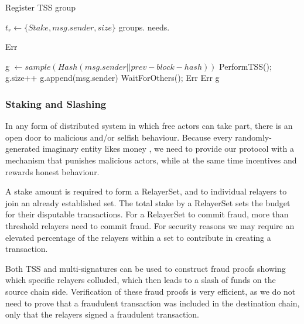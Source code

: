     	\begin{algorithm}[H]
			\caption{Register TSS group}
			\begin{algorithmic}[1]
				\Require $t_r \gets \{Stake, msg.sender, size\}$
				\Require groups.  
				\Require needs.
				
				    \State \Return Err
				\EndIf
				
				    \State g $\gets sample(Hash(msg.sender || prev-block-hash))$ 
				        \State PerformTSS();
				    \Else
				        \State g.size++
				        \State g.append(msg.sender)
				        \State WaitForOthers();
				        \Else
				    	\State \Return Err
				    	\EndIf
				    \EndIf
				\Else
				\State \Return Err
				\EndIf
				\State \Return g
			\end{algorithmic}
			\label{alg:register_TSS}
		\end{algorithm}

\subsubsection*{Staking and Slashing}
In any form of distributed system in which free actors can take part, there is an open door to malicious and/or selfish behaviour. Because every randomly-generated imaginary entity likes money \cite{LightningNetwork}, we need to provide our protocol with a mechanism that punishes malicious actors, while at the same time incentives and rewards honest behaviour.

A stake amount is required to form a RelayerSet, and to individual relayers to join an already established set. The total stake by a RelayerSet sets the budget for their disputable transactions. For a RelayerSet to commit fraud, more than threshold relayers need to commit fraud. For security reasons we may require an elevated percentage of the relayers within a set to contribute in creating a transaction. 

Both TSS and multi-signatures can be used to construct fraud proofs showing which specific relayers colluded, which then leads to a slash of funds on the source chain side. Verification of these fraud proofs is very efficient, as we do not need to prove that a fraudulent transaction was included in the destination chain, only that the relayers signed a fraudulent transaction.

